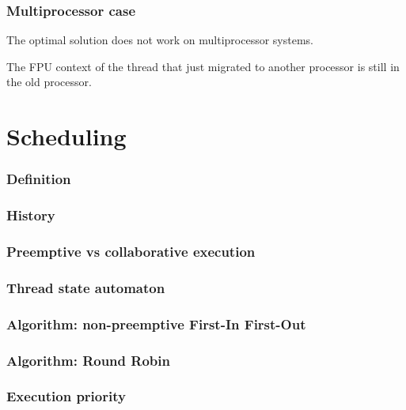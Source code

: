 
\begin{frame}
  \frametitle{Multiprocessor case}

  The optimal solution does not work on multiprocessor systems.

  \begin{center}
  \end{center}

  The FPU context of the thread that just migrated to another
  processor is still in the old processor.

\end{frame}

%
%

\section{Scheduling}


\begin{frame}
  \frametitle{Definition}
\end{frame}


\begin{frame}
  \frametitle{History}
\end{frame}


\begin{frame}
  \frametitle{Preemptive vs collaborative execution}
\end{frame}


\begin{frame}
  \frametitle{Thread state automaton}
\end{frame}


\begin{frame}
  \frametitle{Algorithm: non-preemptive First-In First-Out}
\end{frame}


\begin{frame}
  \frametitle{Algorithm: Round Robin}
\end{frame}


\begin{frame}
  \frametitle{Execution priority}
\end{frame}


